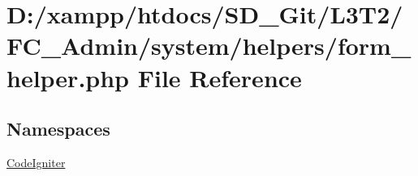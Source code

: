 \hypertarget{_admin_2system_2helpers_2form__helper_8php}{}\section{D\+:/xampp/htdocs/\+S\+D\+\_\+\+Git/\+L3\+T2/\+F\+C\+\_\+\+Admin/system/helpers/form\+\_\+helper.php File Reference}
\label{_admin_2system_2helpers_2form__helper_8php}
\subsection*{Namespaces}
\begin{DoxyCompactItemize}
\item 
 \hyperlink{namespace_code_igniter}{Code\+Igniter}
\end{DoxyCompactItemize}
